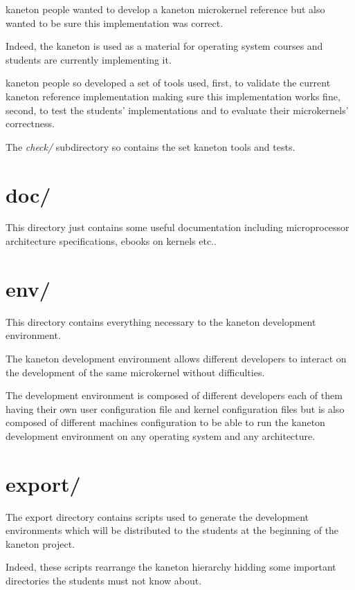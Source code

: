 kaneton people wanted to develop a kaneton microkernel reference but
also wanted to be sure this implementation was correct.

Indeed, the kaneton is used as a material for operating system courses and
students are currently implementing it.

kaneton people so developed a set of tools used, first, to validate the
current kaneton reference implementation making sure this implementation
works fine, second, to test the students' implementations and to evaluate
their microkernels' correctness.

The \textit{check/} subdirectory so contains the set kaneton tools and tests.

%
%

\section{doc/}

This directory just contains some useful documentation including
microprocessor architecture specifications, ebooks on kernels etc..

%
%

\section{env/}

This directory contains everything necessary to the kaneton
development environment.

The kaneton development environment allows different developers to
interact on the development of the same microkernel without difficulties.

The development environment is composed of different developers each
of them having their own user configuration file and kernel configuration
files but is also composed of different machines configuration to be able
to run the kaneton development environment on any operating system and any
architecture.

%
%

\section{export/}

The export directory contains scripts used to generate the
development environments which will be distributed to the students
at the beginning of the kaneton project.

Indeed, these scripts rearrange the kaneton hierarchy hidding some
important directories the students must not know about.

